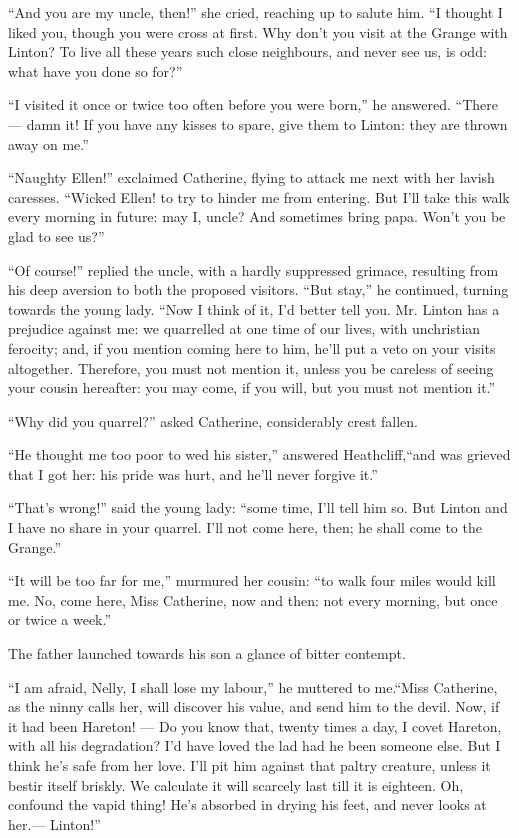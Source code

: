 \par “And you are my uncle, then!” she cried, reaching up to salute him. “I thought I liked you, though you were cross at first. Why don't you visit at the Grange with Linton? To live all these years such close neighbours, and never see us, is odd: what have you done so for?”
\par “I visited it once or twice too often before you were born,” he answered. “There — damn it! If you have any kisses to spare, give them to Linton: they are thrown away on me.”
\par “Naughty Ellen!” exclaimed Catherine, flying to attack me next with her lavish caresses. “Wicked Ellen! to try to hinder me from entering. But I'll take this walk every morning in future: may I, uncle? And sometimes bring papa. Won't you be glad to see us?”
\par “Of course!” replied the uncle, with a hardly suppressed grimace, resulting from his deep aversion to both the proposed visitors. “But stay,” he continued, turning towards the young lady. “Now I think of it, I'd better tell you. Mr. Linton has a prejudice against me: we quarrelled at one time of our lives, with unchristian ferocity; and, if you mention coming here to him, he'll put a veto on your visits altogether. Therefore, you must not mention it, unless you be careless of seeing your cousin hereafter: you may come, if you will, but you must not mention it.”
\par “Why did you quarrel?” asked Catherine, considerably crest fallen.
\par “He thought me too poor to wed his sister,” answered Heathcliff,“and was grieved that I got her: his pride was hurt, and he'll never forgive it.”
\par “That's wrong!” said the young lady: “some time, I'll tell him so. But Linton and I have no share in your quarrel. I'll not come here, then; he shall come to the Grange.”
\par “It will be too far for me,” murmured her cousin: “to walk four miles would kill me. No, come here, Miss Catherine, now and then: not every morning, but once or twice a week.”
\par The father launched towards his son a glance of bitter contempt.
\par “I am afraid, Nelly, I shall lose my labour,” he muttered to me.“Miss Catherine, as the ninny calls her, will discover his value, and send him to the devil. Now, if it had been Hareton! — Do you know that, twenty times a day, I covet Hareton, with all his degradation? I'd have loved the lad had he been someone else. But I think he's safe from her love. I'll pit him against that paltry creature, unless it bestir itself briskly. We calculate it will scarcely last till it is eighteen. Oh, confound the vapid thing! He's absorbed in drying his feet, and never looks at her.— Linton!”
